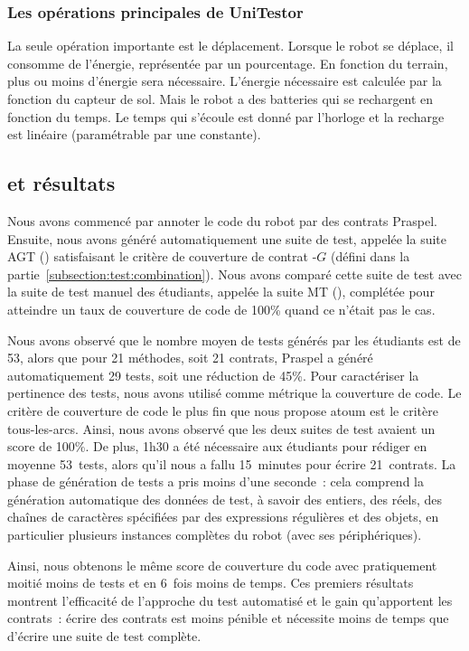 \subsubsection{Les opérations principales de UniTestor}

La seule opération importante est le déplacement. Lorsque le robot se déplace,
il consomme de l'énergie, représentée par un pourcentage. En fonction du
terrain, plus ou moins d'énergie sera nécessaire. L'énergie nécessaire est
calculée par la fonction  du capteur de sol. Mais le robot
a des batteries qui se rechargent en fonction du temps. Le temps qui s'écoule
est donné par l'horloge et la recharge est linéaire (paramétrable par une
constante).

\subsection{ et résultats}

Nous avons commencé par annoter le code du robot par des contrats Praspel.
Ensuite, nous avons généré automatiquement une suite de test, appelée la suite
AGT () satisfaisant le critère de
couverture de contrat -$G$ (défini dans la
partie~\ref{subsection:test:combination}). Nous avons comparé cette suite de
test avec la suite de test manuel des étudiants, appelée la suite MT
(), complétée pour atteindre un taux de couverture de
code de 100\% quand ce n'était pas le cas.

Nous avons observé que le nombre moyen de tests générés par les étudiants est de
53, alors que pour 21 méthodes, soit 21 contrats, Praspel a généré
automatiquement 29 tests, soit une réduction de 45\%. Pour caractériser la
pertinence des tests, nous avons utilisé comme métrique la couverture de code.
Le critère de couverture de code le plus fin que nous propose atoum est le
critère tous-les-arcs. Ainsi, nous avons observé que les deux suites de test
avaient un score de 100\%. De plus, 1h30 a été nécessaire aux étudiants pour
rédiger en moyenne 53~tests, alors qu'il nous a fallu 15~minutes pour écrire
21~contrats.  La phase de génération de tests a pris moins d'une seconde~: cela
comprend la génération automatique des données de test, à savoir des entiers,
des réels, des chaînes de caractères spécifiées par des expressions régulières
et des objets, en particulier plusieurs instances complètes du robot (avec ses
périphériques).

Ainsi, nous obtenons le même score de couverture du code avec pratiquement
moitié moins de tests et en 6~fois moins de temps. Ces premiers résultats
montrent l'efficacité de l'approche du test automatisé et le gain qu'apportent
les contrats~: écrire des contrats est moins pénible et nécessite moins de temps
que d'écrire une suite de test complète.

